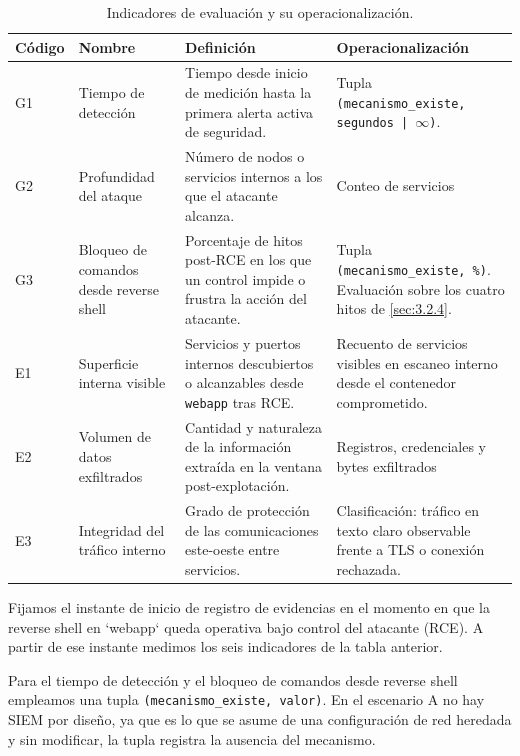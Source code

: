 \documentclass[11pt,spanish,listoffigures,listoftables]{tfgetsinf}
\begin{document}
    \begin{table}[ht]
      \centering
      \label{tab:kpi-definicion}
      \footnotesize
      \begin{tabularx}{\textwidth}{@{}l l X X@{}}
        \textbf{Código} & \textbf{Nombre} & \textbf{Definición} & \textbf{Operacionalización} \\
        \midrule
        G1 & Tiempo de detección & Tiempo desde inicio de medición hasta la primera alerta activa de seguridad. & Tupla \texttt{(mecanismo\_existe, segundos | $\infty$)}. \\
        \midrule
        G2 & Profundidad del ataque & Número de nodos o servicios internos a los que el atacante alcanza. & Conteo de servicios  \\
        \midrule
        G3 & Bloqueo de comandos desde reverse shell & Porcentaje de hitos post-RCE en los que un control impide o frustra la acción del atacante. & Tupla \texttt{(mecanismo\_existe, \%)}. Evaluación sobre los cuatro hitos de \cref{sec:3.2.4}. \\
        \midrule
        E1 & Superficie interna visible & Servicios y puertos internos descubiertos o alcanzables desde \texttt{webapp} tras RCE. & Recuento de servicios visibles en escaneo interno desde el contenedor comprometido. \\
        \midrule
        E2 & Volumen de datos exfiltrados & Cantidad y naturaleza de la información extraída en la ventana post-explotación. & Registros, credenciales y bytes exfiltrados \\
        \midrule
        E3 & Integridad del tráfico interno & Grado de protección de las comunicaciones este-oeste entre servicios. & Clasificación: tráfico en texto claro observable frente a TLS o conexión rechazada. \\
        \bottomrule
      \end{tabularx}
      \caption{Indicadores de evaluación y su operacionalización.}
    \end{table}
    
    Fijamos el instante de inicio de registro de evidencias en el momento en que la reverse shell en `webapp` queda operativa bajo control del atacante (RCE). A partir de ese instante medimos los seis indicadores de la tabla anterior.

    Para el tiempo de detección y el bloqueo de comandos desde reverse shell empleamos una tupla \texttt{(mecanismo\_existe, valor)}. En el escenario A no hay SIEM por diseño, ya que es lo que se asume de una configuración de red heredada y sin modificar, la tupla registra la ausencia del mecanismo.
    
\end{document}
